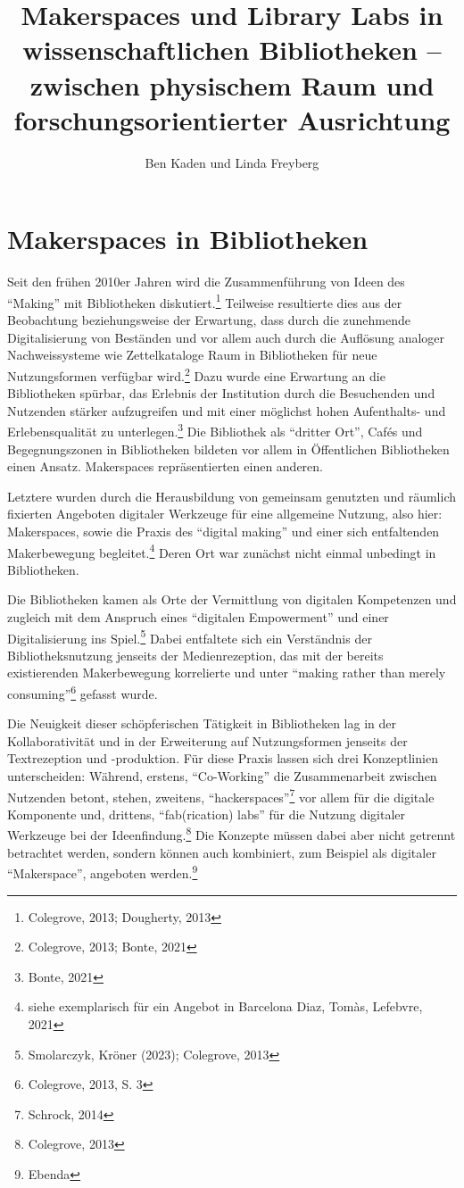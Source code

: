 \documentclass[a4paper,
fontsize=11pt,
oneside,
numbers=noperiodatend,
parskip=half-,
bibliography=totoc,
final
]{scrartcl}
\title{\LARGE{Makerspaces und Library Labs in wissenschaftlichen Bibliotheken -- zwischen physischem Raum und forschungsorientierter Ausrichtung}}%
\author{Ben Kaden und Linda Freyberg} %
\date{}
\begin{document}
\maketitle
\thispagestyle{fancyplain} 


\hypertarget{makerspaces-in-bibliotheken}{%
\section{Makerspaces in
Bibliotheken}\label{makerspaces-in-bibliotheken}}

Seit den frühen 2010er Jahren wird die Zusammenführung von Ideen des
\enquote{Making} mit Bibliotheken diskutiert.\footnote{Colegrove, 2013;
  Dougherty, 2013} Teilweise resultierte dies aus der Beobachtung
beziehungsweise der Erwartung, dass durch die zunehmende Digitalisierung
von Beständen und vor allem auch durch die Auflösung analoger
Nachweissysteme wie Zettelkataloge Raum in Bibliotheken für neue
Nutzungsformen verfügbar wird.\footnote{Colegrove, 2013; Bonte, 2021}
Dazu wurde eine Erwartung an die Bibliotheken spürbar, das Erlebnis der
Institution durch die Besuchenden und Nutzenden stärker aufzugreifen und
mit einer möglichst hohen Aufenthalts- und Erlebensqualität zu
unterlegen.\footnote{Bonte, 2021} Die Bibliothek als \enquote{dritter
Ort}, Cafés und Begegnungszonen in Bibliotheken bildeten vor allem in
Öffentlichen Bibliotheken einen Ansatz. Makerspaces repräsentierten
einen anderen.

Letztere wurden durch die Herausbildung von gemeinsam genutzten und
räumlich fixierten Angeboten digitaler Werkzeuge für eine allgemeine
Nutzung, also hier: Makerspaces, sowie die Praxis des \enquote{digital
making} und einer sich entfaltenden Makerbewegung begleitet.\footnote{siehe
  exemplarisch für ein Angebot in Barcelona Diaz, Tomàs, Lefebvre, 2021}
Deren Ort war zunächst nicht einmal unbedingt in Bibliotheken.

Die Bibliotheken kamen als Orte der Vermittlung von digitalen
Kompetenzen und zugleich mit dem Anspruch eines \enquote{digitalen
Empowerment} und einer Digitalisierung ins Spiel.\footnote{Smolarczyk,
  Kröner (2023); Colegrove, 2013} Dabei entfaltete sich ein Verständnis
der Bibliotheksnutzung jenseits der Medienrezeption, das mit der bereits
existierenden Makerbewegung korrelierte und unter \enquote{making rather
than merely consuming}\footnote{Colegrove, 2013, S. 3} gefasst wurde.

Die Neuigkeit dieser schöpferischen Tätigkeit in Bibliotheken lag in der
Kollaborativität und in der Erweiterung auf Nutzungsformen jenseits der
Textrezeption und -produktion. Für diese Praxis lassen sich drei
Konzeptlinien unterscheiden: Während, erstens, \enquote{Co-Working} die
Zusammenarbeit zwischen Nutzenden betont, stehen, zweitens,
\enquote{hackerspaces}\footnote{Schrock, 2014} vor allem für die
digitale Komponente und, drittens, \enquote{fab(rication) labs} für die
Nutzung digitaler Werkzeuge bei der Ideenfindung.\footnote{Colegrove,
  2013} Die Konzepte müssen dabei aber nicht getrennt betrachtet werden,
sondern können auch kombiniert, zum Beispiel als digitaler
\enquote{Makerspace}, angeboten werden.\footnote{Ebenda}
\end{document}
